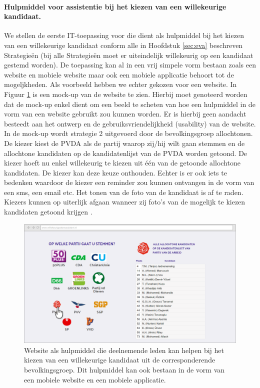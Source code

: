 \paragraph{Hulpmiddel voor assistentie bij het kiezen van een willekeurige kandidaat.}
We stellen de eerste IT-toepassing voor die dient als hulpmiddel bij het kiezen van een willekeurige kandidaat conform alle in Hoofdstuk \ref{sec:eva} beschreven Strategie\"{e}n (bij alle Strategie\"{e}n moet er uiteindelijk willekeurig op een kandidaat gestemd worden). De toepassing kan al in een vrij simpele vorm bestaan zoals een website en mobiele website maar ook een mobiele applicatie behoort tot de mogeljkheden. Als voorbeeld hebben we echter gekozen voor een website. In Figuur \ref{fig:verkW} is een mock-up van de website te zien. Hierbij moet genoteerd worden dat de mock-up enkel dient om een beeld te scheten van hoe een hulpmiddel in de vorm van een website gebruikt zou kunnen worden. Er is hierbij geen aandacht besteedt aan het ontwerp en de gebruiksvriendelijkheid (usability) van de website. \\
\indent In de mock-up wordt strategie 2 uitgevoerd door de bevolkingsgroep allochtonen. De kiezer kiest de PVDA als de partij waarop zij/hij wilt gaan stemmen en de allochtone kandidaten op de kandidatenlijst van de PVDA worden getoond. De kiezer hoeft nu enkel willekeurig te kiezen uit één van de getoonde allochtone kandidaten. De kiezer kan deze keuze onthouden. Echter is er ook iets te bedenken waardoor de kiezer een reminder zou kunnen ontvangen in de vorm van een sms, een email etc. Het tonen van de foto van de kandidaat is af te raden. Kiezers kunnen op uiterlijk afgaan wanneer zij foto's van de mogelijk te kiezen kandidaten getoond krijgen \citep{banducci2008ballot,lawson2010looking}. \\


\begin{figure}[H]


	\includegraphics[width=\linewidth]{website_verkiezingen.png}

			\caption{Website als hulpmiddel die deelnemende leden kan helpen bij het kiezen van een willekeurige kandidaat uit de corresponderende bevolkingsgroep. Dit hulpmiddel kan ook bestaan in de vorm van een mobiele website en een mobiele applicatie.}

\label{fig:verkW}
\end{figure}

